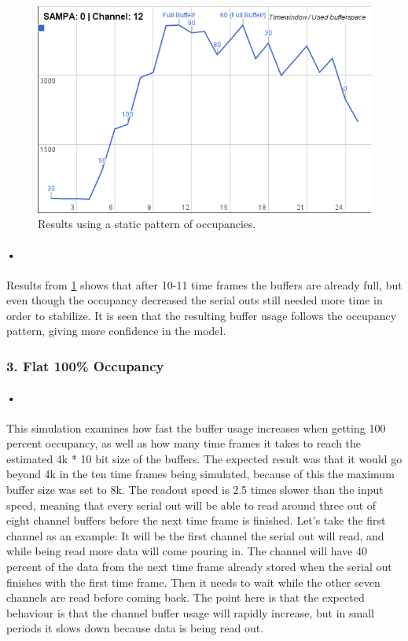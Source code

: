 \documentclass[a4paper, 12pt]{report}
\begin{document}
\begin{figure}[h!]
	\centering
		\includegraphics[width=1.0\textwidth]{images/results-alternating.png}
		\caption{Results using a static pattern of occupancies.}
		\label{fig:results-alternating}
\end{figure}

\paragraph{•} %
Results from \ref{fig:results-alternating} shows that after 10-11 time frames the buffers are already full, but even though the occupancy decreased the serial outs still needed more time in order to stabilize.
It is seen that the resulting buffer usage follows the occupancy pattern, giving more confidence in the model.

\subsubsection{3. Flat 100\% Occupancy}

\paragraph{•} %
This simulation examines how fast the buffer usage increases when getting 100 percent occupancy, as well as how many time frames it takes to reach the estimated 4k * 10 bit size of the buffers.
The expected result was that it would go beyond 4k in the ten time frames being simulated, because of this the maximum buffer size was set to 8k.
The readout speed is 2.5 times slower than the input speed, meaning that every serial out will be able to read around three out of eight channel buffers before the next time frame is finished.
Let's take the first channel as an example: It will be the first channel the serial out will read, and while being read more data will come pouring in.
The channel will have 40 percent of the data from the next time frame already stored when the serial out finishes with the first time frame.
Then it needs to wait while the other seven channels are read before coming back.
The point here is that the expected behaviour is that the channel buffer usage will rapidly increase, but in small periods it slows down because data is being read out.
\end{document}

